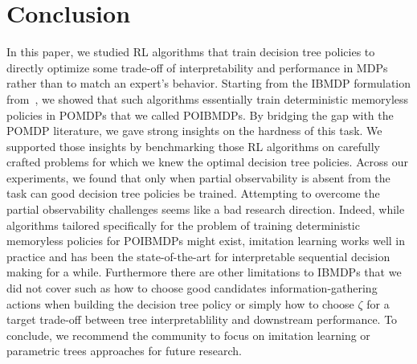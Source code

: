 \documentclass[10pt]{article} %
\theoremstyle{definition}
\begin{document}
\section{Conclusion}
In this paper, we studied RL algorithms that train decision tree policies to directly optimize some trade-off of interpretability and performance in MDPs rather than to match an expert's behavior.
Starting from the IBMDP formulation from~\cite{topin2021iterative}, we showed that such algorithms essentially train deterministic memoryless policies in POMDPs that we called POIBMDPs.
By bridging the gap with the POMDP literature, we gave strong insights on the hardness of this task.
We supported those insights by benchmarking those RL algorithms on carefully crafted problems for which we knew the optimal decision tree policies.
Across our experiments, we found that only when partial observability is absent from the task can good decision tree policies be trained.
Attempting to overcome the partial observability challenges seems like a bad research direction.
Indeed, while algorithms tailored specifically for the problem of training deterministic memoryless policies for POIBMDPs might exist, imitation learning works well in practice and has been the state-of-the-art for interpretable sequential decision making for a while.
Furthermore there are other limitations to IBMDPs that we did not cover such as how to choose good candidates information-gathering actions when building the decision tree policy or simply how to choose $\zeta$ for a target trade-off between tree interpretablility and downstream performance.
To conclude, we recommend the community to focus on imitation learning or parametric trees approaches for future research.
\end{document}
